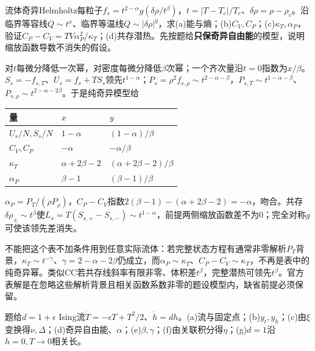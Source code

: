 \begin{exercise}[原题1(a)--(d)]\label{r:334-2-1}
流体奇异Helmholtz每粒子$f_s=t^{2-\alpha}g(\delta\rho/t^\beta)$，$t=|T-T_c|/T_c$、$\delta\rho=\rho-\rho_c$。沿临界等容线$Q\sim t^x$、临界等温线$Q\sim|\delta\rho|^y$，求(a)能与熵；(b)$C_V,C_P$；(c)$\kappa_T,\alpha_P$，验证$C_P-C_V=TV\alpha_P^2/\kappa_T$；(d)共存潜热。先按题给\textbf{只保奇异自由能}的模型，说明缩放函数导数不消失的假设。
\end{exercise}
\begin{solution}
对$t$每微分降低一次幂，对密度每微分降低$\beta$次幂；一个齐次量沿$t=0$指数为$x/\beta$。$S_s=-f_{s,T}$、$U_s=f_s+TS_s$领先$t^{1-\alpha}$；$P_s=\rho^2f_{s,\rho}\sim t^{2-\alpha-\beta}$，$P_{s,T}\sim t^{1-\alpha-\beta}$、$P_{s,\rho}\sim t^{2-\alpha-2\beta}$。于是纯奇异模型给
\begin{center}\begin{tabular}{lll}\toprule 量&$x$&$y$\\\midrule $U_s/N,S_s/N$&$1-\alpha$&$(1-\alpha)/\beta$\\ $C_V,C_P$&$-\alpha$&$-\alpha/\beta$\\ $\kappa_T$&$\alpha+2\beta-2$&$(\alpha+2\beta-2)/\beta$\\ $\alpha_P$&$\beta-1$&$(\beta-1)/\beta$\\\bottomrule\end{tabular}\end{center}
$\alpha_P=P_T/(\rho P_\rho)$，$C_P-C_V$指数$2(\beta-1)-(\alpha+2\beta-2)=-\alpha$，吻合。共存$\delta\rho_\pm\sim t^\beta$使$L_s=T(S_{s,+}-S_{s,-})\sim t^{1-\alpha}$，前提两侧缩放函数差不为0；完全对称$g$可使该领先差消失。

不能把这个表不加条件用到任意实际流体：若完整状态方程有通常非零解析$P_T$背景，$\kappa_T\sim t^{-\gamma}$、$\gamma=2-\alpha-2\beta$仍成立，而$\alpha_P\sim\kappa_T$、$C_P-C_V\sim\kappa_T$，不再是表中的纯奇异幂。类似CC若共存线斜率有限非零、体积差$t^\beta$，完整潜热可领先$t^\beta$。官方表解是在忽略这些解析背景且相关函数系数非零的题设模型内，缺省前提必须保留。
\end{solution}
\begin{exercise}[原题2(a)--(g)]\label{r:334-2-2}
题给$d=1+\epsilon$ Ising流$\dot T=-\epsilon T+T^2/2$、$\dot h=dh$。(a)流与固定点；(b)$y_t,y_h$；(c)由$\xi$变换得$\nu,\Delta$；(d)奇异自由能、$\alpha$；(e)$\beta,\gamma$；(f)由关联积分得$\eta$；(g)$d=1$沿$h=0,T\to0$相关长。
\end{exercise}
